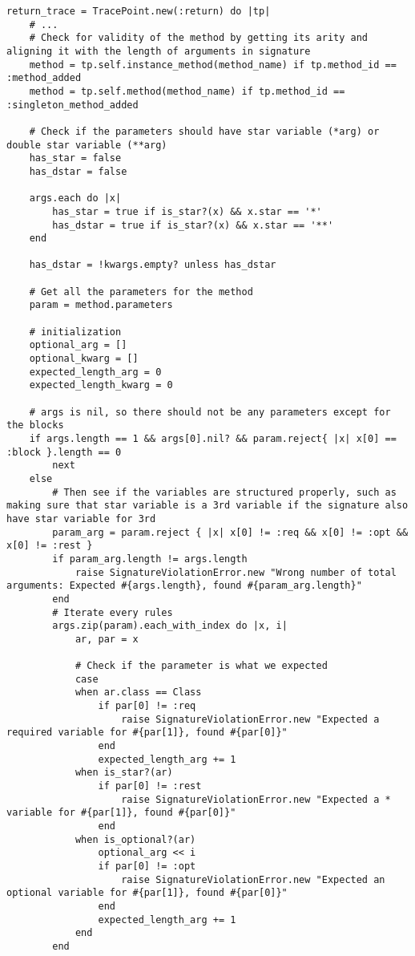 \begin{lstlisting}[caption={Wrapper method: check if the method has correct argument(s)}]
return_trace = TracePoint.new(:return) do |tp|
    # ...
    # Check for validity of the method by getting its arity and aligning it with the length of arguments in signature
    method = tp.self.instance_method(method_name) if tp.method_id == :method_added
    method = tp.self.method(method_name) if tp.method_id == :singleton_method_added

    # Check if the parameters should have star variable (*arg) or double star variable (**arg)
    has_star = false
    has_dstar = false

    args.each do |x|                        
        has_star = true if is_star?(x) && x.star == '*'
        has_dstar = true if is_star?(x) && x.star == '**'
    end

    has_dstar = !kwargs.empty? unless has_dstar

    # Get all the parameters for the method
    param = method.parameters

    # initialization
    optional_arg = []
    optional_kwarg = []
    expected_length_arg = 0
    expected_length_kwarg = 0

    # args is nil, so there should not be any parameters except for the blocks
    if args.length == 1 && args[0].nil? && param.reject{ |x| x[0] == :block }.length == 0
        next
    else
        # Then see if the variables are structured properly, such as making sure that star variable is a 3rd variable if the signature also have star variable for 3rd
        param_arg = param.reject { |x| x[0] != :req && x[0] != :opt && x[0] != :rest }
        if param_arg.length != args.length
            raise SignatureViolationError.new "Wrong number of total arguments: Expected #{args.length}, found #{param_arg.length}"
        end
        # Iterate every rules
        args.zip(param).each_with_index do |x, i|
            ar, par = x

            # Check if the parameter is what we expected
            case
            when ar.class == Class
                if par[0] != :req
                    raise SignatureViolationError.new "Expected a required variable for #{par[1]}, found #{par[0]}"
                end
                expected_length_arg += 1
            when is_star?(ar)
                if par[0] != :rest
                    raise SignatureViolationError.new "Expected a * variable for #{par[1]}, found #{par[0]}"
                end
            when is_optional?(ar)
                optional_arg << i
                if par[0] != :opt
                    raise SignatureViolationError.new "Expected an optional variable for #{par[1]}, found #{par[0]}"
                end
                expected_length_arg += 1
            end
        end


\end{lstlisting}
